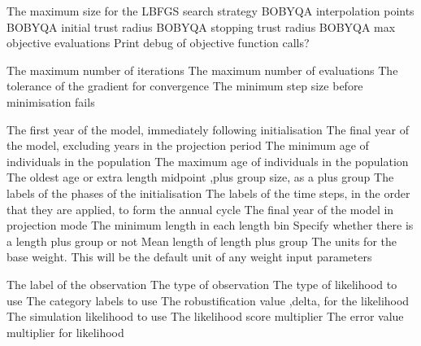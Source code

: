  {The maximum size for the LBFGS search strategy}
 {BOBYQA interpolation points}
 {BOBYQA initial trust radius}
 {BOBYQA stopping trust radius}
 {BOBYQA max objective evaluations}
 {Print debug of objective function calls?}
\par\textbf{}\par
{} {The maximum number of iterations}
 {The maximum number of evaluations}
 {The tolerance of the gradient for convergence}
 {The minimum step size before minimisation fails}
\par\par
{} {The first year of the model, immediately following initialisation}
 {The final year of the model, excluding years in the projection period}
 {The minimum age of individuals in the population}
 {The maximum age of individuals in the population}
 {The oldest age or extra length midpoint ,plus group size, as a plus group}
 {The labels of the phases of the initialisation}
 {The labels of the time steps, in the order that they are applied, to form the annual cycle}
 {The final year of the model in projection mode}
 {The minimum length in each length bin}
 {Specify whether there is a length plus group or not}
 {Mean length of length plus group}
 {The units for the base weight. This will be the default unit of any weight input parameters}
\par\par
{} {The label of the observation}
 {The type of observation}
 {The type of likelihood to use}
 {The category labels to use}
 {The robustification value ,delta, for the likelihood}
 {The simulation likelihood to use}
 {The likelihood score multiplier}
 {The error value multiplier for likelihood}
